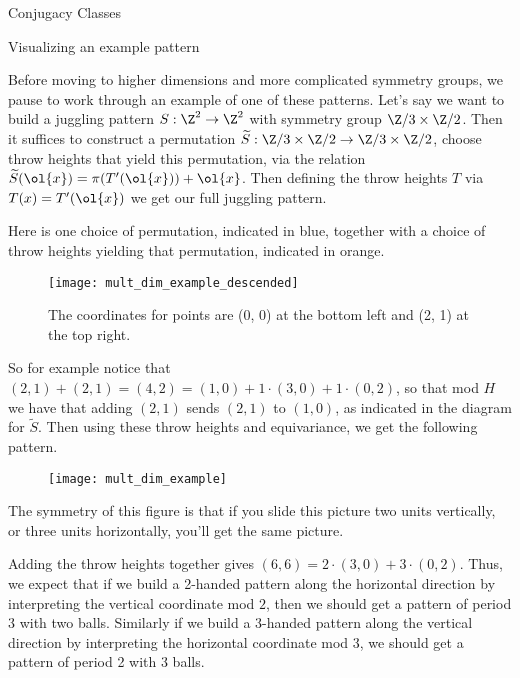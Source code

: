 \documentclass[12nt]{article}
\theoremstyle{plain}
\begin{document}
\begin{subsection}{Conjugacy Classes}
\newpage

\begin{subsection}{Visualizing an example pattern}

Before moving to higher dimensions and more complicated symmetry groups, we pause to work through an example of one of these patterns. Let's say we want to build a juggling pattern $S : \Z^2 \to \Z^2$ with symmetry group $\Z/3 \times \Z/2$. Then it suffices to construct a permutation $\widetilde{S} : \Z/3 \times \Z/2 \to \Z/3 \times \Z/2$, choose throw heights that yield this permutation, via the relation $\widetilde{S}(\ol{x}) = \pi(T'(\ol{x})) + \ol{x}$. Then defining the throw heights $T$ via $T(x) = T'(\ol{x})$ we get our full juggling pattern.

Here is one choice of permutation, indicated in blue, together with a choice of throw heights yielding that permutation, indicated in orange.

\begin{figure}[h]
\texttt{[image: mult\_dim\_example\_descended]}
\caption{The coordinates for points are (0, 0) at the bottom left and (2, 1) at the top right.}
\end{figure}
So for example notice that $(2, 1) + (2, 1) = (4, 2) = (1, 0) + 1\cdot(3, 0) + 1 \cdot (0, 2)$, so that mod $H$ we have that adding $(2, 1)$ sends $(2, 1)$ to $(1, 0)$, as indicated in the diagram for $\widetilde{S}$. Then using these throw heights and equivariance, we get the following pattern. 

\begin{figure}[h]
\texttt{[image: mult\_dim\_example]}
\end{figure}

\newpage
The symmetry of this figure is that if you slide this picture two units vertically, or three units horizontally, you'll get the same picture. 

Adding the throw heights together gives $(6, 6) = 2 \cdot (3, 0) + 3 \cdot (0, 2)$. Thus, we expect that if we build a 2-handed pattern along the horizontal direction by interpreting the vertical coordinate mod $2$, then we should get a pattern of period 3 with two balls. Similarly if we build a 3-handed pattern along the vertical direction by interpreting the horizontal coordinate mod 3, we should get a pattern of period 2 with 3 balls.


\end{subsection}
\end{subsection}
\end{document}
